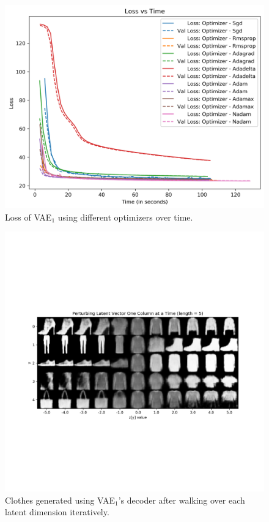 \documentclass[12pt]{article}
\begin{document}
\begin{figure}
  \centering
  \includegraphics[width=\linewidth]{task_5_loss_time.png}
  \caption{Loss of VAE$_1$ using different optimizers over time.}
  \label{fig:task_5_loss_time_1}
\end{figure}

\begin{figure}
  \centering
  \includegraphics[width=\linewidth]{task_5_clothes_kernel_3_kernels_16_latent_5.png}
  \caption{Clothes generated using VAE$_1$'s decoder after walking over each latent dimension iteratively.}
  \label{fig:task_5_clothes_kernel_3_kernels_16_latent_5}
\end{figure}
\end{document}
